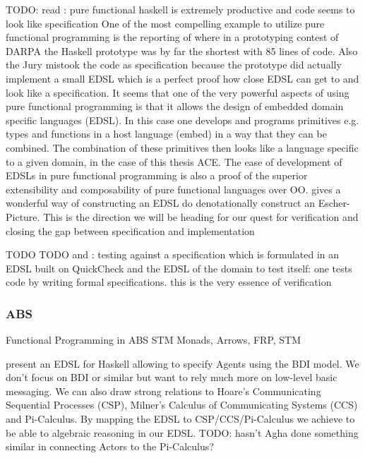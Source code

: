 TODO: read \cite{hudak_haskell_1994}: pure functional haskell is extremely productive and code seems to look like specification 
One of the most compelling example to utilize pure functional programming is the reporting of \cite{hudak_haskell_1994} where in a prototyping contest of DARPA the Haskell prototype was by far the shortest with 85 lines of code. Also the Jury mistook the code as specification because the prototype did actually implement a small EDSL which is a perfect proof how close EDSL can get to and look like a specification.
It seems that one of the very powerful aspects of using pure functional programming is that it allows the design of embedded domain specific languages (EDSL). In this case one develops and programs primitives e.g. types and functions in a host language (embed) in a way that they can be combined. The combination of these primitives then looks like a language specific to a given domain, in the case of this thesis ACE. The ease of development of EDSLs in pure functional programming is also a proof of the superior extensibility and composability of pure functional languages over OO. \cite{henderson_functional_1982} gives a wonderful way of constructing an EDSL do denotationally construct an Escher-Picture. This is the direction we will be heading for our quest for verification and closing the gap between specification and implementation
 
TODO \cite{hutton_programming_2007}
TODO \cite{claessen_quickcheck:_2000} and \cite{claessen_testing_2002}: testing against a specification which is formulated in an EDSL built on QuickCheck and the EDSL of the domain to test itself: one tests code by writing formal specifications. this is the very essence of verification


\subsubsection{ABS}
Functional Programming in ABS
STM Monads, Arrows, FRP, STM
\cite{Bezirgiannis2013}

\cite{sulzmann_specifying_2007} present an EDSL for Haskell allowing to specify Agents using the BDI model. We don't focus on BDI or similar but want to rely much more on low-level basic messaging. We can also draw strong relations to Hoare's Communicating Sequential Processes (CSP), Milner's Calculus of Communicating Systems (CCS) and Pi-Calculus. By mapping the EDSL to CSP/CCS/Pi-Calculus we achieve to be able to algebraic reasoning in our EDSL. TODO: hasn't Agha done something similar in connecting Actors to the Pi-Calculus?

